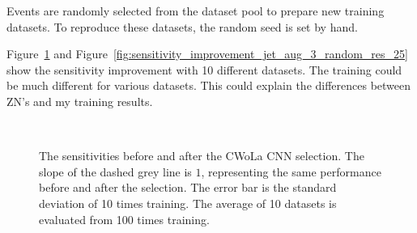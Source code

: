 \documentclass[12pt]{article}
\begin{document}
        Events are randomly selected from the dataset pool to prepare new training datasets. To reproduce these datasets, the random seed is set by hand.

        Figure~\ref{fig:sensitivity_improvement_origin_random_res_25} and Figure~\ref{fig:sensitivity_improvement_jet_aug_3_random_res_25} show the sensitivity improvement with 10 different datasets. The training could be much different for various datasets. This could explain the differences between ZN's and my training results.
        \begin{figure}[htpb]
            \centering
             \\
            \caption{The sensitivities before and after the CWoLa CNN selection. The slope of the dashed grey line is $1$, representing the same performance before and after the selection. The error bar is the standard deviation of 10 times training. The average of 10 datasets is evaluated from 100 times training.}
            \label{fig:sensitivity_improvement_origin_random_res_25}
        \end{figure}
\end{document}
